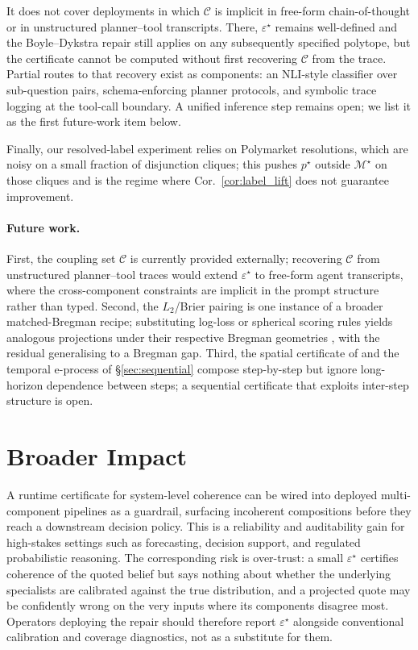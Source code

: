 \documentclass{article}
\theoremstyle{plain}
\theoremstyle{definition}
\theoremstyle{remark}
\newcommand{\Mjoint}{\mathcal{M}^{\star}}
\newcommand{\Cset}{\mathcal{C}}
\newcommand{\eps}{\varepsilon}
\begin{document}
It does not cover deployments in which $\Cset$ is implicit in
free-form chain-of-thought or in unstructured planner--tool
transcripts. There, $\eps^\star$ remains well-defined and the
Boyle--Dykstra repair still applies on any subsequently specified
polytope, but the certificate cannot be computed without first
recovering $\Cset$ from the trace. Partial routes to that
recovery exist as components: an NLI-style classifier over
sub-question pairs, schema-enforcing planner protocols, and
symbolic trace logging at the tool-call boundary. A unified
inference step remains open; we list it as the first future-work
item below.

Finally, our resolved-label experiment relies on Polymarket
resolutions, which are noisy on a small fraction of disjunction
cliques; this pushes $p^\star$ outside $\Mjoint$ on those cliques
and is the regime where Cor.~\ref{cor:label_lift} does not
guarantee improvement.

\paragraph{Future work.}
First, the coupling set $\Cset$
is currently provided externally; recovering $\Cset$ from
unstructured planner--tool traces would extend $\eps^\star$ to
free-form agent transcripts, where the cross-component constraints
are implicit in the prompt structure rather than typed. Second, the
$L_2$/Brier pairing is one instance of a broader matched-Bregman
recipe; substituting log-loss or spherical scoring rules yields
analogous projections under their respective Bregman geometries
\citep{banerjee2005clustering}, with the residual generalising to a
Bregman gap. Third, the spatial certificate of 
and the temporal e-process of \S\ref{sec:sequential} compose
step-by-step but ignore long-horizon dependence between steps;
a sequential certificate that exploits inter-step structure is
open.

\section*{Broader Impact}

A runtime certificate for system-level coherence can be wired into
deployed multi-component pipelines as a guardrail, surfacing
incoherent compositions before they reach a downstream decision
policy. This is a reliability and auditability gain for high-stakes
settings such as forecasting, decision support, and regulated
probabilistic reasoning. The corresponding risk is over-trust: a
small $\eps^\star$ certifies coherence of the quoted belief but
says nothing about whether the underlying specialists are
calibrated against the true distribution, and a projected quote may
be confidently wrong on the very inputs where its components
disagree most. Operators deploying the repair should therefore
report $\eps^\star$ alongside conventional calibration and coverage
diagnostics, not as a substitute for them.
\end{document}
